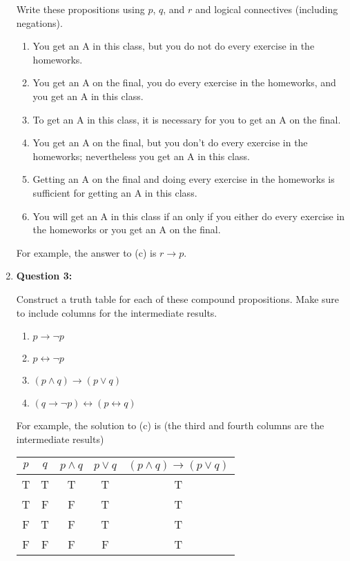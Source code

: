\documentclass[11pt]{article}
\begin{document}
\begin{enumerate}
Write these propositions using $p$, $q$, and $r$ and logical connectives (including negations).

\begin{enumerate}[label=(\alph*)]
\item You get an A in this class, but you do not do every exercise in the homeworks.
\item You get an A on the final, you do every exercise in the homeworks, and you get an A in this class.
\item To get an A in this class, it is necessary for you to get an A on the final.
\item You get an A on the final, but you don't do every exercise in the homeworks; nevertheless you get an A in this class.
\item Getting an A on the final and doing every exercise in the homeworks is sufficient for getting an A in this class.
\item You will get an A in this class if an only if you either do every exercise in the homeworks or you get an A on the final.
\end{enumerate}

For example, the answer to (c) is $r \rightarrow p$.

\item
\textbf{Question 3:}

Construct a truth table for each of these compound propositions. Make sure to include columns for the intermediate results.

\begin{enumerate}[label=(\alph*)]
\item $p \rightarrow \lnot p$
\item $p \leftrightarrow \lnot p$
\item $(p \land q) \rightarrow (p \lor q)$
\item $(q \rightarrow \lnot p) \leftrightarrow (p \leftrightarrow q)$
\end{enumerate}

For example, the solution to (c) is (the third and fourth columns are the intermediate results)

\begin{center}
\begin{tabular}{|c|c|c|c|c|}
\hline
$p$ & $q$ & $p \land q$ & $p \lor q$ & $(p \land q) \rightarrow (p \lor q)$\\
\hline
T & T & T & T & T\\
T & F & F & T & T\\
F & T & F & T & T\\
F & F & F & F & T\\
\hline
\end{tabular}
\end{center}


\end{enumerate}
\end{document}
